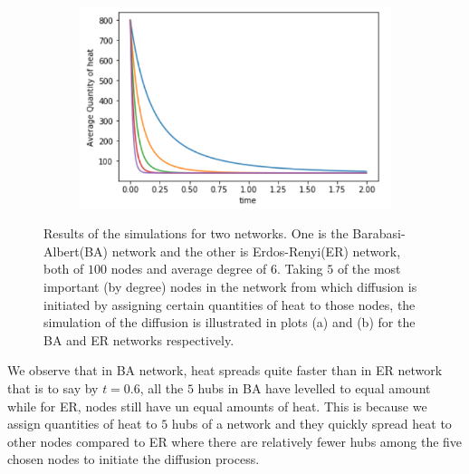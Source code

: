 \documentclass[10pt,a4paper]{article}
\begin{document}
\begin{figure}[!h]
\begin{subfigure}[b]{0.45\textwidth}
    	\caption{}
    	\label{}
    \end{subfigure}~
    \begin{subfigure}[b]{0.45\textwidth}
    	\includegraphics[width= \textwidth]{images/E-R-random.png}
    	\caption{}
    	\label{}
    \end{subfigure}
    \caption{ Results of the simulations for two networks. One is the Barabasi-Albert(BA) network and  the other is Erdos-Renyi(ER) network, both of $100$ nodes and average degree of $6$. Taking $5$ of the most important (by degree) nodes in the network from which diffusion is initiated by assigning certain quantities of heat to those nodes, the simulation of the diffusion is illustrated in plots (a) and (b) for the BA and ER networks respectively.}
    \label{key}
\end{figure}

We observe that in BA network, heat spreads quite faster than in ER network that is to say by $t=0.6$, all the $5$ hubs in BA have levelled to equal amount while for ER, nodes still have un equal amounts of heat. This is because we assign quantities of heat to $5$ hubs of a network and they quickly spread heat to other nodes compared to ER where there are relatively fewer hubs among the five chosen nodes to initiate the diffusion process.

\newpage
\end{document}
